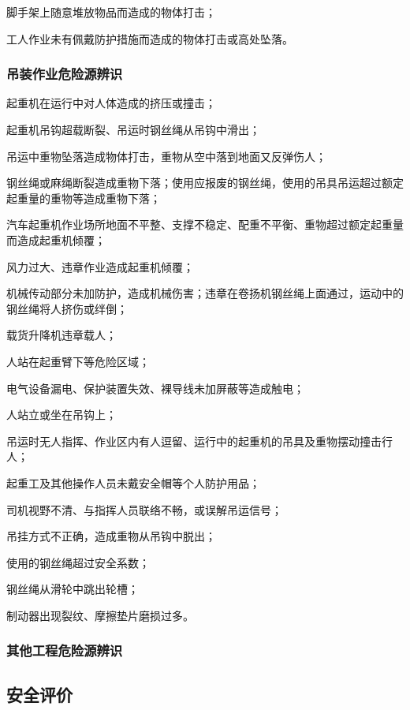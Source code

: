  脚手架上随意堆放物品而造成的物体打击；

 工人作业未有佩戴防护措施而造成的物体打击或高处坠落。

\subsubsection{吊装作业危险源辨识}

 起重机在运行中对人体造成的挤压或撞击；

 起重机吊钩超载断裂、吊运时钢丝绳从吊钩中滑出；

 吊运中重物坠落造成物体打击，重物从空中落到地面又反弹伤人；

 钢丝绳或麻绳断裂造成重物下落；使用应报废的钢丝绳，使用的吊具吊运超过额定起重量的重物等造成重物下落；

 汽车起重机作业场所地面不平整、支撑不稳定、配重不平衡、重物超过额定起重量而造成起重机倾覆；

 风力过大、违章作业造成起重机倾覆；

 机械传动部分未加防护，造成机械伤害；违章在卷扬机钢丝绳上面通过，运动中的钢丝绳将人挤伤或绊倒；

 载货升降机违章载人；

 人站在起重臂下等危险区域；

 电气设备漏电、保护装置失效、裸导线未加屏蔽等造成触电；

 人站立或坐在吊钩上；

 吊运时无人指挥、作业区内有人逗留、运行中的起重机的吊具及重物摆动撞击行人；

 起重工及其他操作人员未戴安全帽等个人防护用品；

 司机视野不清、与指挥人员联络不畅，或误解吊运信号；

 吊挂方式不正确，造成重物从吊钩中脱出；

 使用的钢丝绳超过安全系数；

 钢丝绳从滑轮中跳出轮槽；

 制动器出现裂纹、摩擦垫片磨损过多。

\subsubsection{其他工程危险源辨识}
\subsection{安全评价}

